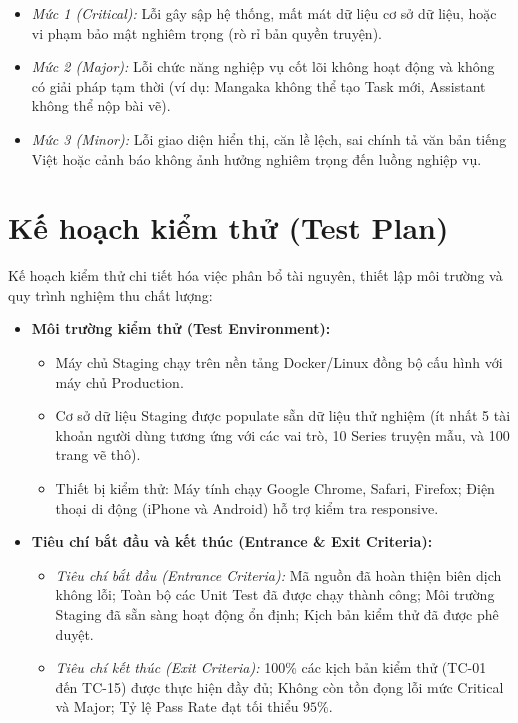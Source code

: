 \begin{itemize}
    \begin{itemize}
        \item \textit{Mức 1 (Critical):} Lỗi gây sập hệ thống, mất mát dữ liệu cơ sở dữ liệu, hoặc vi phạm bảo mật nghiêm trọng (rò rỉ bản quyền truyện).
        \item \textit{Mức 2 (Major):} Lỗi chức năng nghiệp vụ cốt lõi không hoạt động và không có giải pháp tạm thời (ví dụ: Mangaka không thể tạo Task mới, Assistant không thể nộp bài vẽ).
        \item \textit{Mức 3 (Minor):} Lỗi giao diện hiển thị, căn lề lệch, sai chính tả văn bản tiếng Việt hoặc cảnh báo không ảnh hưởng nghiêm trọng đến luồng nghiệp vụ.
    \end{itemize}
\end{itemize}

\section{Kế hoạch kiểm thử (Test Plan)}
\label{sec:test_plan}

Kế hoạch kiểm thử chi tiết hóa việc phân bổ tài nguyên, thiết lập môi trường và quy trình nghiệm thu chất lượng:

\begin{itemize}
    \item \textbf{Môi trường kiểm thử (Test Environment):}
    \begin{itemize}
        \item Máy chủ Staging chạy trên nền tảng Docker/Linux đồng bộ cấu hình với máy chủ Production.
        \item Cơ sở dữ liệu Staging được populate sẵn dữ liệu thử nghiệm (ít nhất 5 tài khoản người dùng tương ứng với các vai trò, 10 Series truyện mẫu, và 100 trang vẽ thô).
        \item Thiết bị kiểm thử: Máy tính chạy Google Chrome, Safari, Firefox; Điện thoại di động (iPhone và Android) hỗ trợ kiểm tra responsive.
    \end{itemize}
    \item \textbf{Tiêu chí bắt đầu và kết thúc (Entrance \& Exit Criteria):}
    \begin{itemize}
        \item \textit{Tiêu chí bắt đầu (Entrance Criteria):} Mã nguồn đã hoàn thiện biên dịch không lỗi; Toàn bộ các Unit Test đã được chạy thành công; Môi trường Staging đã sẵn sàng hoạt động ổn định; Kịch bản kiểm thử đã được phê duyệt.
        \item \textit{Tiêu chí kết thúc (Exit Criteria):} 100\% các kịch bản kiểm thử (TC-01 đến TC-15) được thực hiện đầy đủ; Không còn tồn đọng lỗi mức Critical và Major; Tỷ lệ Pass Rate đạt tối thiểu $95\%$.
    \end{itemize}
\end{itemize}

